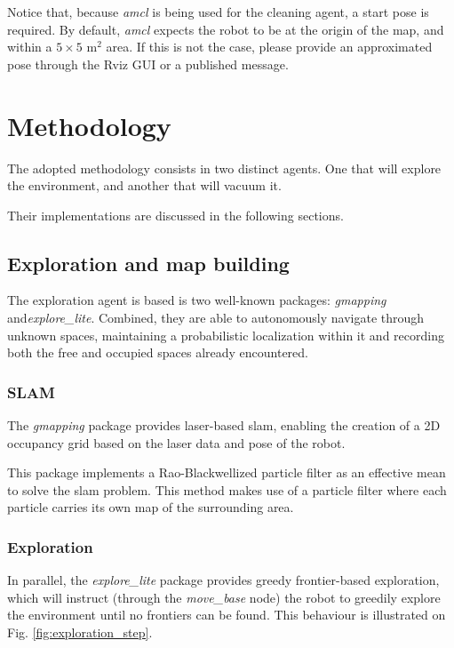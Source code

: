 \documentclass[]{article}
\begin{document}
Notice that, because \textit{amcl} is being used for the cleaning agent, a start pose is required. By default, \textit{amcl} expects the robot to be at the origin of the map, and within a $5 \times 5 \text{ m}^2$ area. If this is not the case, please provide an approximated pose through the Rviz GUI or a published message.

\section{Methodology}

The adopted methodology consists in two distinct agents. One that will explore the environment, and another that will vacuum it.

Their implementations are discussed in the following sections.

\subsection{Exploration and map building}

The exploration agent is based is two well-known packages: \textit{gmapping} and\textit{explore\_lite}. Combined, they are able to autonomously navigate through unknown spaces, maintaining a probabilistic localization within it and recording both the free and occupied spaces already encountered.

\subsubsection{SLAM}

The \textit{gmapping} \cite{grisetti2005improving, grisetti2007improved} package provides laser-based \gls{slam}, enabling the creation of a 2D occupancy grid based on the laser data and pose of the robot.

This package implements a Rao-Blackwellized particle filter as an effective mean to solve the \gls{slam} problem. This method makes use of a particle filter where each particle carries its own map of the surrounding area.

\subsubsection{Exploration}

In parallel, the \textit{explore\_lite} \cite{Horner2016} package provides greedy frontier-based exploration, which will instruct (through the \textit{move\_base} node) the robot to greedily explore the environment until no frontiers can be found. This behaviour is illustrated on Fig. \ref{fig:exploration_step}.
\end{document}
